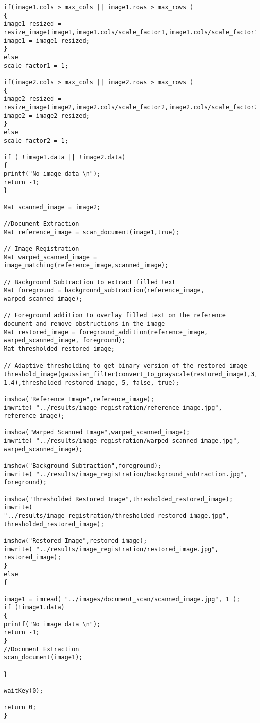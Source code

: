 \begin{lstlisting}
if(image1.cols > max_cols || image1.rows > max_rows )
{
image1_resized = resize_image(image1,image1.cols/scale_factor1,image1.cols/scale_factor1);
image1 = image1_resized;
}
else
scale_factor1 = 1;

if(image2.cols > max_cols || image2.rows > max_rows )
{
image2_resized = resize_image(image2,image2.cols/scale_factor2,image2.cols/scale_factor2);
image2 = image2_resized;
}
else
scale_factor2 = 1;

if ( !image1.data || !image2.data)
{
printf("No image data \n");
return -1;
}

Mat scanned_image = image2;

//Document Extraction
Mat reference_image = scan_document(image1,true);

// Image Registration
Mat warped_scanned_image = image_matching(reference_image,scanned_image);

// Background Subtraction to extract filled text
Mat foreground = background_subtraction(reference_image, warped_scanned_image);

// Foreground addition to overlay filled text on the reference document and remove obstructions in the image
Mat restored_image = foreground_addition(reference_image, warped_scanned_image, foreground);
Mat thresholded_restored_image;

// Adaptive thresholding to get binary version of the restored image
threshold_image(gaussian_filter(convert_to_grayscale(restored_image),3, 1.4),thresholded_restored_image, 5, false, true);

imshow("Reference Image",reference_image);
imwrite( "../results/image_registration/reference_image.jpg", reference_image);

imshow("Warped Scanned Image",warped_scanned_image);
imwrite( "../results/image_registration/warped_scanned_image.jpg", warped_scanned_image);

imshow("Background Subtraction",foreground);
imwrite( "../results/image_registration/background_subtraction.jpg", foreground);

imshow("Thresholded Restored Image",thresholded_restored_image);
imwrite( "../results/image_registration/thresholded_restored_image.jpg", thresholded_restored_image);

imshow("Restored Image",restored_image);
imwrite( "../results/image_registration/restored_image.jpg", restored_image);
}
else
{

image1 = imread( "../images/document_scan/scanned_image.jpg", 1 );
if (!image1.data)
{
printf("No image data \n");
return -1;
}
//Document Extraction
scan_document(image1);

}

waitKey(0);

return 0;
}


\end{lstlisting}
